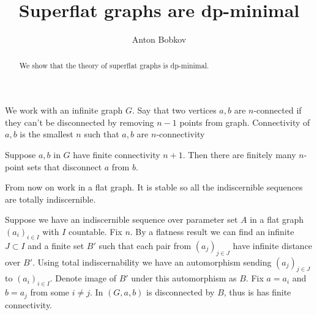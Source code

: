 \documentclass{amsart}
\begin{document}
\title{Superflat graphs are dp-minimal}
\author{Anton Bobkov}

\begin{abstract}
	We show that the theory of superflat graphs is dp-minimal.
\end{abstract}

\maketitle

We work with an infinite graph $G$. Say that two vertices $a, b$ are $n$-connected if they can't be disconnected by removing $n-1$ points from graph. Connectivity of $a,b$ is the smallest $n$ such that $a,b$ are $n$-connectivity

\begin{Lemma}
	Suppose $a,b$ in $G$ have finite connectivity $n+1$. Then there are finitely many $n$-point sets that disconnect $a$ from $b$.
\end{Lemma}

From now on work in a flat graph. It is stable so all the indiscernible sequences are totally indiscernible.

Suppose we have an indiscernible sequence over parameter set $A$ in a flat graph $(a_i)_{i \in I}$ with $I$ countable. Fix $n$. By a flatness result we can find an infinite $J \subset I$ and a finite set $B'$ such that each pair from $(a_j)_{j \in J}$ have infinite distance over $B'$. Using total indiscernability we have an automorphism sending $(a_j)_{j \in J}$ to $(a_i)_{i \in I}$. Denote image of $B'$ under this automorphism as $B$. Fix $a = a_i$ and $b = a_j$ from some $i \neq j$. In $(G, a, b)$ is disconnected by $B$, thus is has finite connectivity. 
\end{document}
